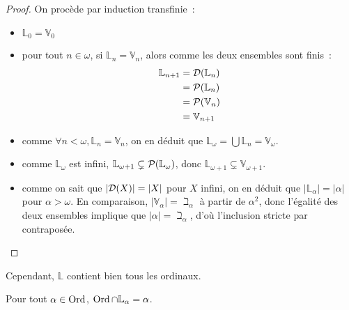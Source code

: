 \begin{proof}
  On procède par induction transfinie~:
  \begin{itemize}
  \item $\mathbb L_0 = \mathbb V_0$
  \item pour tout $n \in \omega$, si $\mathbb L_n = \mathbb V_n$, alors comme
    les deux ensembles sont finis~:
    \begin{align*}
      \mathbb L_{n+1} &= \mathcal{D}(\mathbb L_n)\\
      &= \mathcal{P}(\mathbb L_n)\\
      &= \mathcal{P}(\mathbb V_n)\\
      &= \mathbb V_{n+1}
    \end{align*}
  \item comme $\forall n < \omega, \mathbb L_n = \mathbb V_n$, on en déduit que
    $\mathbb L_\omega = \bigcup \mathbb L_n = \mathbb V_\omega$.
  \item comme $\mathbb L_\omega$ est infini,
    $\mathbb L_{\omega+1} \subsetneq \mathcal{P}(\mathbb L_\omega)$, donc
    $\mathbb L_{\omega+1} \subsetneq\mathbb V_{\omega+1}$.
  \item comme on sait que $|\mathcal{D}(X)| = |X|$ pour $X$ infini, on en déduit
    que $|\mathbb L_{\alpha}| = |\alpha|$ pour $\alpha > \omega$. En comparaison,
    $|\mathbb V_\alpha| = \beth_\alpha$ à partir de $\alpha^2$, donc l'égalité
    des deux ensembles implique que $|\alpha| = \beth_\alpha$, d'où l'inclusion
    stricte par contraposée.
  \end{itemize}
\end{proof}

Cependant, $\mathbb L$ contient bien tous les ordinaux.

\begin{proposition}
  Pour tout $\alpha \in \operatorname{Ord}$, $\operatorname{Ord} \cap \mathbb L_\alpha = \alpha$.
\end{proposition}

